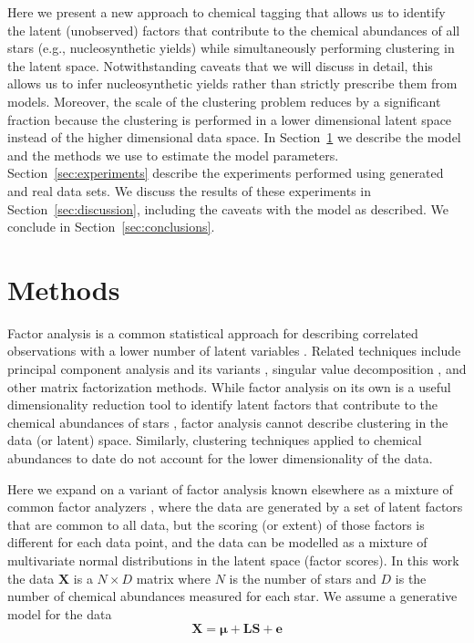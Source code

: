 \documentclass[twocolumn]{aastex62}
\newcommand{\vect}[1]{\boldsymbol{\mathbf{#1}}}
\renewcommand{\vec}[1]{\vect{#1}}
\newcommand{\vecdataunscaled}{\vec{X}}
\newcommand{\factorloads}{\textbf{L}}
\newcommand{\factorscores}{\textbf{S}}
\newcommand{\NumData}{N}
\newcommand{\NumDimensions}{D}
\begin{document}
Here we present a new approach to chemical tagging that allows us to identify 
the latent (unobserved) factors that contribute to the chemical abundances of 
all stars (e.g., nucleosynthetic yields) while simultaneously performing 
clustering in the latent space. Notwithstanding caveats that we will
discuss in detail, this allows us to infer nucleosynthetic yields rather than
strictly prescribe them from models. Moreover, the scale of the clustering
problem reduces by a significant fraction because the clustering is performed in
a lower dimensional latent space instead of the higher dimensional data space.
In Section~\ref{sec:methods} we describe the model and the methods we use to
estimate the model parameters. Section~\ref{sec:experiments} describe the 
experiments performed using generated and real data sets. We discuss the results
of these experiments in Section~\ref{sec:discussion}, including the caveats with
the model as described. We conclude in Section~\ref{sec:conclusions}.



\section{Methods} \label{sec:methods}

Factor analysis is a common statistical approach for describing correlated 
observations with a lower number of latent variables \citep[e.g.,][]{Thompson:2004}.
Related techniques include principal component analysis \citep{Hotelling:1933} and its
variants \citep{Tipping;Bishop:1999}, singular value decomposition \citep{Golub:1970}, and other
matrix factorization methods. While factor analysis on its own is a useful
dimensionality reduction tool to identify latent factors that contribute to
the chemical abundances of stars \citep[e.g.,][]{Price-Jones:2018}, factor
analysis cannot describe clustering in the data (or latent) space.
Similarly, clustering techniques applied to chemical abundances to date 
\citep[e.g.,][]{Hogg:2016} do not account for the lower dimensionality of the
data. 

Here we expand on a variant of factor analysis known elsewhere as a mixture of common 
factor analyzers \citep{Baek:2010}, where the data are generated by a set of 
latent factors that are common to all data, but the scoring (or extent) of those
factors is different for each data point, and the data can be modelled as a
mixture of multivariate normal distributions in the latent space (factor scores).
In this work the data $\vecdataunscaled$ is a 
$\NumData \times \NumDimensions$ matrix where $\NumData$ is the number of 
stars and $\NumDimensions$ is the number of chemical abundances measured 
for each star. We assume a generative model for the data 
\begin{equation}
	\vecdataunscaled = \vec\mu + \factorloads\factorscores + \vec{e}
	\label{eq:generative-model}
\end{equation}
\end{document}
